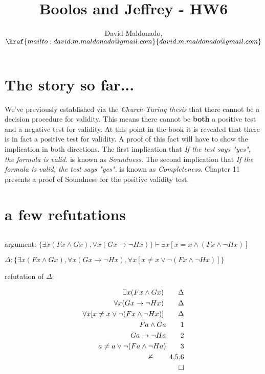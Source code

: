 \documentclass[a4paper,11pt]{article}
\author{David Maldonado, $\href{mailto:david.m.maldonado@gmail.com}%
{david.m.maldonado@gmail.com}$}
\title{Boolos and Jeffrey - HW6}
\begin{document}
\maketitle


\section{The story so far...}

We've previously established via the \textit{Church-Turing thesis} that there cannot 
be a decision procedure for validity. This means there cannot be \textbf{both} a positive test
and a negative test for validity. At this point in the book it is revealed that there is in fact a 
positive test for validity. A proof of this fact will have to show the implication in both directions.
The first implication that \textit{If the test says "yes", the formula is valid.} is known as \textit{Soundness}.
The second implication that \textit{If the formula is valid, the test says "yes".} is known as \textit{Completeness}.
Chapter 11 presents a proof of Soundness for the positive validity test.

\section{a few refutations}


\subsection{}

argument: $ \{ \exists x(Fx \land Gx), \forall x(Gx \rightarrow \lnot Hx) \} \vdash \exists x[x=x \land (Fx \land \lnot Hx)] $

\bigskip

\noindent $\Delta: \{ \exists x(Fx \land Gx), \forall x(Gx \rightarrow \lnot Hx), \forall x[x \neq x \lor \lnot(Fx \land \lnot Hx)] \}$

\bigskip

\noindent refutation of $\Delta:$

\begin{align*} 
  \exists x(Fx \land Gx)        								\tag*{$\Delta$} \\
  \forall x(Gx \rightarrow \lnot Hx)							\tag*{$\Delta$} \\
  \forall x[x \neq x \lor \lnot(Fx \land \lnot Hx)]    		                		\tag*{$\Delta$} \\
  Fa \land Ga       										\tag*{1} \\
  Ga \rightarrow \lnot Ha                                                                       \tag*{2} \\
  a \neq a \lor \lnot(Fa \land \lnot Ha)							\tag*{3} \\
  \nvDash												\tag*{4,5,6} \\
  \qedhere
\end{align*}
\end{document}
